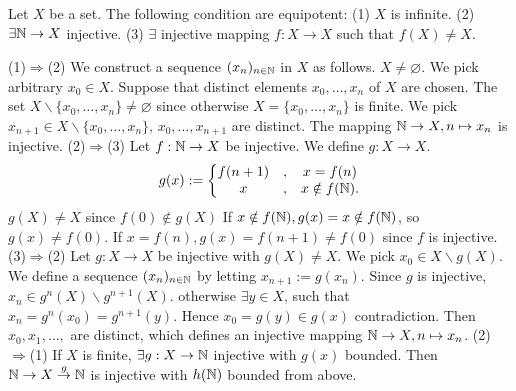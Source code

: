 \begin{propositionenv}
    Let $X$ be a set. The following condition are equipotent:
    \newline
    (1) $X$ is infinite.
    \newline
    (2) $\exists \mathbb{N}\rightarrow X$ injective.
    \newline
    (3) $\exists$ injective mapping $f:X\rightarrow X$ such that $f(X)\not=X$.
\end{propositionenv}
\begin{proofenv}
    \quad
    \newline
    (1)$\Rightarrow$(2) We construct a sequence $(x_n)_{n\in \mathbb{N}}$ in $X$ as follows. $X\not=\varnothing$. We pick arbitrary $x_0\in X$. Suppose that distinct elements $x_0, \dots,  x_n$ of $X$ are chosen. The set $X\backslash\{x_0, \dots, x_n\}\not=\varnothing$ since otherwise $X=\{x_0, \dots, x_n\}$ is finite. We pick $x_{n+1}\in X\backslash\{x_0, \dots, x_n\}, \,  x_0, \dots, x_{n+1}$ are distinct. The mapping $\mathbb{N}\rightarrow X,  n\mapsto x_n$ is injective.
    \newline
    (2)$\Rightarrow$(3) Let $f:\mathbb{N}\rightarrow X$ be injective. We define $g:X\rightarrow X$.
    $$g(x):=
\left\{\begin{matrix}
 f(n+1)&,  &x=f(n) \\
x&, &x\notin f(\mathbb{N}).
\end{matrix}\right. $$
$g(X)\not=X$ since $f(0)\notin g(X)$ If $x\notin f(\mathbb{N}), g(x)=x\notin f(\mathbb{N})$,  so $g(x)\not=f(0)$. If $x=f(n),  g(x)=f(n+1)\not=f(0)$ since $f$ is injective.
\newline
(3)$\Rightarrow$(2) Let $g:X\rightarrow X$ be injective with $g(X)\not=X$. We pick $x_0\in X\backslash g(X)$. We define a sequence $(x_n)_{n\in\mathbb{N}}$ by letting $x_{n+1}:=g(x_n)$. Since $g$ is injective,  $x_n\in g^n(X)\backslash g^{n+1}(X)$. otherwise $\exists y\in X$,  such that $x_n=g^{n}(x_0)=g^{n+1}(y)$. Hence $x_0=g(y)\in g(x)$ contradiction. Then $x_0, x_1, \dots, $ are distinct,  which defines an injective mapping $\mathbb{N}\rightarrow X, n\mapsto x_n$.
\newline
(2)$\Rightarrow$(1) If $X$ is finite,  $\exists g:X\rightarrow\mathbb{N}$ injective with $g(x)$ bounded. Then $\mathbb{N}\rightarrow X\overset{g}{\rightarrow}\mathbb{N}$ is injective with $h(\mathbb{N})$ bounded from above.
\end{proofenv}